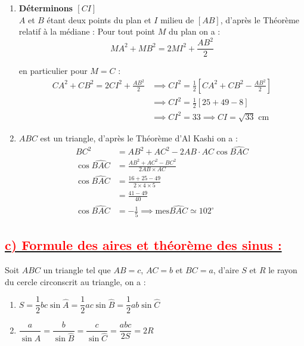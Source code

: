 \documentclass[12pt,a4paper]{article}
\begin{document}
\begin{enumerate}
    \item \textbf{Déterminons $[CI]$} \\
    $A$ et $B$ étant deux points du plan et $I$ milieu de $[AB]$, d'après le Théorème relatif à la médiane :
    Pour tout point $M$ du plan on a :
\[
MA^2 + MB^2 = 2MI^2 + \frac{AB^2}{2}
\]

en particulier pour $M = C$ :
\begin{align*}
CA^2 + CB^2 = 2CI^2 + \frac{AB^2}{2} &\implies CI^2 = \frac{1}{2} \left[ CA^2 + CB^2 - \frac{AB^2}{2} \right] \\
&\implies CI^2 = \frac{1}{2} \left[ 25 + 49 - 8 \right] \\
&\implies \boxed{CI^2 = 33 \implies CI = \sqrt{33} \text{ cm}}
\end{align*}
\item $ABC$ est un triangle, d'après le Théorème d'Al Kashi on a :
    \begin{align*}
    BC^2 &= AB^2 + AC^2 - 2AB \cdot AC \cos \widehat{BAC} \\
    \cos \widehat{BAC} &= \frac{AB^2 + AC^2 - BC^2}{2AB \times AC} \\
    \cos \widehat{BAC} &= \frac{16 + 25 - 49}{2 \times 4 \times 5} \\
    &= \frac{41 - 49}{40} \\
    \cos \widehat{BAC} &= -\frac{1}{5} \implies \text{mes}\widehat{BAC} \simeq 102^\circ
    \end{align*}
\end{enumerate}

\subsection*{\underline{\textbf{\textcolor{red}{c) Formule des aires et théorème des sinus :}}}}

Soit $ABC$ un triangle tel que $AB = c$, $AC = b$ et $BC = a$, d'aire $S$ et $R$ le rayon du cercle circonscrit au triangle, on a :

\begin{enumerate}
    \item $S = \dfrac{1}{2} bc \sin \widehat{A} = \dfrac{1}{2} ac \sin \widehat{B} = \dfrac{1}{2} ab \sin \widehat{C}$
    
    \vspace{0.3cm}
    
    \item $\dfrac{a}{\sin \widehat{A}} = \dfrac{b}{\sin \widehat{B}} = \dfrac{c}{\sin \widehat{C}} = \dfrac{abc}{2S} = 2R$
\end{enumerate}
\end{document}
